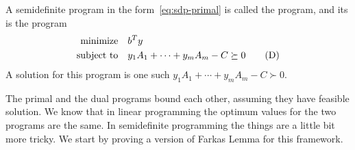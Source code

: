 \documentclass[a4paper,twoside,justified]{tufte-handout}
\begin{document}
\begin{definition}
  A semidefinite program in the form~\eqref{eq:sdp-primal} is called
  the  program, and its  is the program
  \begin{alignat}{2}
    \minimize  b^{T}y \notag \\
    \subjectto  y_{1}A_{1}+\cdots+y_{m}A_{m} -C \succeq
    0 \label{eq:sdp-dual} \tag{D}
  \end{alignat}
  A  solution for this program is one
  such  $  y_{1}A_{1}+\cdots+y_{m}A_{m} -C \succ 0 $.
\end{definition}

The primal and the dual programs bound each other, assuming they have
feasible solution. We know that in linear programming the optimum
values for the two programs are the same. In semidefinite programming
the things are a little bit more tricky.  We start by proving a
version of Farkas Lemma for this framework.
\end{document}
